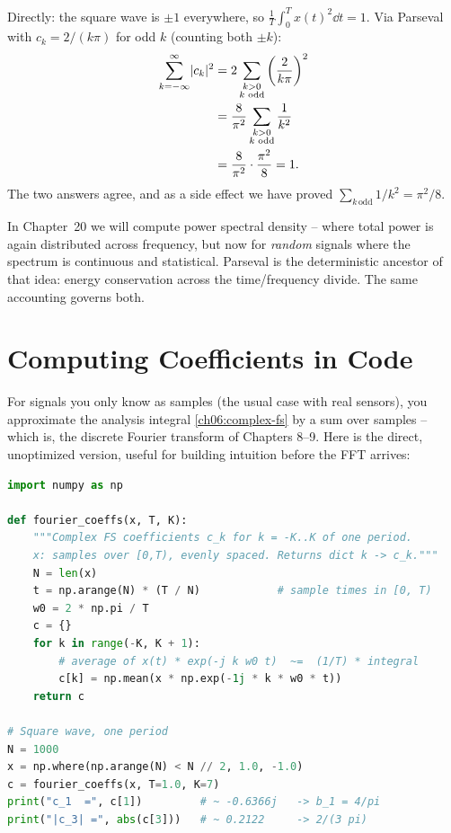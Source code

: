 \begin{example}
Directly: the square wave is \(\pm1\) everywhere, so \(\frac{1}{T}\int_0^T x(t)^2\dd t = 1\). Via
Parseval with \(c_k = 2/(k\pi)\) for odd \(k\) (counting both \(\pm k\)):
\begin{align*}
\sum_{k=-\infty}^{\infty}\lvert c_k\rvert^2 &= 2\sum_{\substack{k>0 \\ k\text{ odd}}}\left(\frac{2}{k\pi}\right)^2 \\
&= \frac{8}{\pi^2}\sum_{\substack{k>0 \\ k\text{ odd}}}\frac{1}{k^2} \\
&= \frac{8}{\pi^2}\cdot\frac{\pi^2}{8} = 1.
\end{align*}
The two answers agree, and as a side effect we have proved
\(\sum_{k\,\text{odd}}1/k^2 = \pi^2/8\).
\end{example}

\begin{connectionbox}
In Chapter~20 we will compute power spectral density -- where
total power is again distributed across frequency, but now for \emph{random} signals where
the spectrum is continuous and statistical. Parseval is the deterministic ancestor of that
idea: energy conservation across the time/frequency divide. The same accounting governs
both.
\end{connectionbox}

\section{Computing Coefficients in Code}

For signals you only know as samples (the usual case with real sensors), you approximate
the analysis integral \eqref{ch06:complex-fs} by a sum over samples -- which is,
the discrete Fourier transform of Chapters 8--9. Here is the
direct, unoptimized version, useful for building intuition before the FFT arrives:

\begin{lstlisting}[language=Python, caption={Fourier coefficients of one period by direct integration.}]
import numpy as np

def fourier_coeffs(x, T, K):
    """Complex FS coefficients c_k for k = -K..K of one period.
    x: samples over [0,T), evenly spaced. Returns dict k -> c_k."""
    N = len(x)
    t = np.arange(N) * (T / N)            # sample times in [0, T)
    w0 = 2 * np.pi / T
    c = {}
    for k in range(-K, K + 1):
        # average of x(t) * exp(-j k w0 t)  ~=  (1/T) * integral
        c[k] = np.mean(x * np.exp(-1j * k * w0 * t))
    return c

# Square wave, one period
N = 1000
x = np.where(np.arange(N) < N // 2, 1.0, -1.0)
c = fourier_coeffs(x, T=1.0, K=7)
print("c_1  =", c[1])         # ~ -0.6366j   -> b_1 = 4/pi
print("|c_3| =", abs(c[3]))   # ~ 0.2122     -> 2/(3 pi)
\end{lstlisting}

